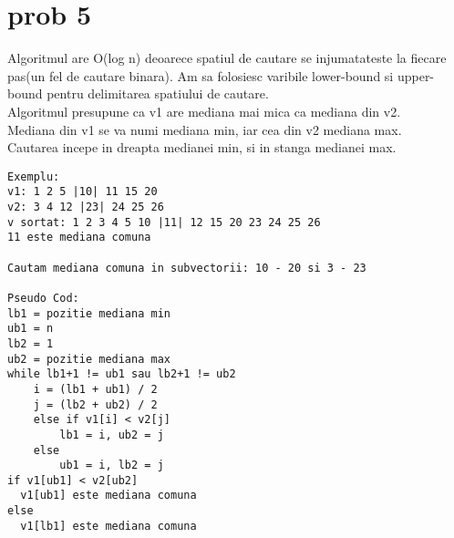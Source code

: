 \documentclass[12pt]{article}
\begin{document}
\section*{prob 5}
Algoritmul are O(log n) deoarece spatiul de cautare se injumatateste la fiecare pas(un fel de cautare binara). Am sa folosiesc varibile lower-bound si upper-bound pentru delimitarea spatiului de cautare. \\
Algoritmul presupune ca v1 are mediana mai mica ca mediana din v2.\\
Mediana din v1 se va numi mediana min, iar cea din v2 mediana max.\\
Cautarea incepe in dreapta medianei min, si in stanga medianei max.
\begin{verbatim}
Exemplu:
v1: 1 2 5 |10| 11 15 20
v2: 3 4 12 |23| 24 25 26
v sortat: 1 2 3 4 5 10 |11| 12 15 20 23 24 25 26
11 este mediana comuna

Cautam mediana comuna in subvectorii: 10 - 20 si 3 - 23

Pseudo Cod:
lb1 = pozitie mediana min
ub1 = n
lb2 = 1
ub2 = pozitie mediana max
while lb1+1 != ub1 sau lb2+1 != ub2
    i = (lb1 + ub1) / 2
    j = (lb2 + ub2) / 2
    else if v1[i] < v2[j]
        lb1 = i, ub2 = j
    else
        ub1 = i, lb2 = j
if v1[ub1] < v2[ub2]
  v1[ub1] este mediana comuna
else
  v1[lb1] este mediana comuna

\end{verbatim}
\end{document}
